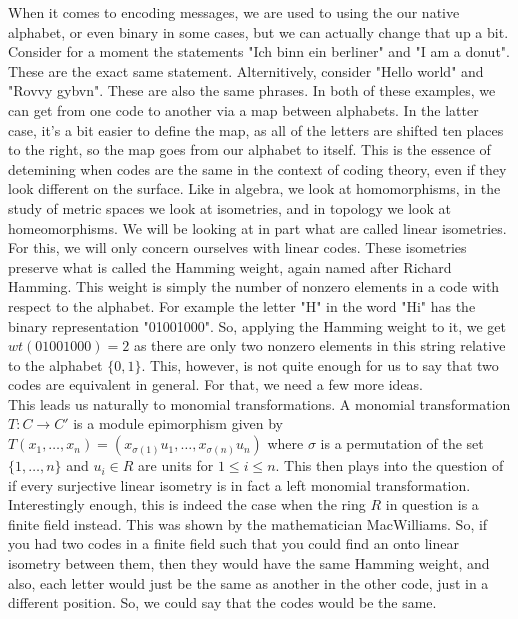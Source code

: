 When it comes to encoding messages, we are used to using the our native alphabet, or even binary in some
cases, but we can actually change that up a bit. Consider for a moment the statements "Ich binn ein
berliner" and "I am a donut". These are the exact same statement. Alternitively, consider "Hello world"
and "Rovvy gybvn". These are also the same phrases. In both of these examples, we can get from one code
to another via a map between alphabets. In the latter case, it's a bit easier to define the map, as all
of the letters are shifted ten places to the right, so the map goes from our alphabet to itself. This is
the essence of detemining when codes are the same in the context of coding theory, even if they look
different on the surface. Like in algebra, we look at homomorphisms, in the study of metric spaces we
look at isometries, and in topology we look at homeomorphisms. We will be looking at in part what are
called linear isometries. For this, we will only concern ourselves with linear codes. These isometries
preserve what is called the Hamming weight, again named after Richard Hamming. This weight is simply the
number of nonzero elements in a code with respect to the alphabet. For example the letter "H" in the
word "Hi" has the binary representation "01001000". So, applying the Hamming weight to it, we get
$wt(01001000)=2$ as there are only two nonzero elements in this string relative to the alphabet
$\{0,1\}$. This, however, is not quite enough for us to say that two codes are equivalent in general.
For that, we need a few more ideas.\\

This leads us naturally to monomial transformations. A monomial transformation $T:C\to C'$ is a module
epimorphism given by $T(x_1,\ldots,x_n)=(x_{\sigma(1)}u_1,\ldots,x_{\sigma(n)}u_n)$ where $\sigma$ is a
permutation of the set $\{1,\ldots,n\}$ and $u_i\in R$ are units for $1\leq i\leq n$. This then plays 
into the question of if every surjective linear isometry is in fact a left monomial transformation.
Interestingly enough, this is indeed the case when the ring $R$ in question is a finite field instead.
This was shown by the mathematician MacWilliams. So, if you had two codes in a finite field such that
you could find an onto linear isometry between them, then they would have the same Hamming weight, and
also, each letter would just be the same as another in the other code, just in a different position. So,
we could say that the codes would be the same.\\



